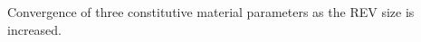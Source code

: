 \label{fig:revconverge} Convergence of three constitutive material parameters as the REV size is increased.